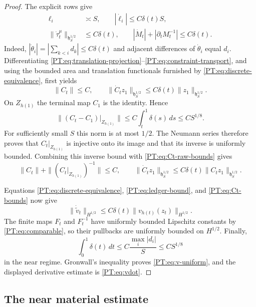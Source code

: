 \begin{proof}
The explicit rows give
\begin{align}
 \ell_i&\asymp S,\qquad
 |\dot\ell_i|\le C\delta(t)S,\label{PT:eq:constraint-row-bounds}\\
 \|\dot\tau_t^\mu\|_{\mathfrak h^{1/2}_S}
 &\le C\delta(t),\qquad
 |\dot M_t|+|\partial_tM_t^{-1}|\le C\delta(t).
\end{align}
Indeed, $|\dot\theta_i|=|\sum_{k<i}d_k|\le C\delta(t)$ and adjacent
differences of $\dot\theta_i$ equal $d_i$.  Differentiating
\eqref{PT:eq:translation-projection}--\eqref{PT:eq:constraint-transport}, and
using the bounded area and translation functionals furnished by
\eqref{PT:eq:discrete-equivalence}, first yields
\begin{equation}\label{PT:eq:Ct-raw-bounds}
 \|C_t\|\le C,
 \qquad
 \|\dot C_tz_1\|_{\mathfrak h^{1/2}_S}
 \le C\delta(t)\|z_1\|_{\mathfrak h^{1/2}_S}.
\end{equation}
On $Z_{h(1)}$ the terminal map $C_1$ is the identity.  Hence
\[
 \|(C_t-C_1)|_{Z_{h(1)}}\|
 \le C\int_t^1\delta(s)\,ds
 \le CS^{1/8}.
\]
For sufficiently small $S$ this norm is at most $1/2$.  The Neumann
series therefore proves that $C_t|_{Z_{h(1)}}$ is injective onto its
image and that its inverse is uniformly bounded.  Combining this inverse
bound with \eqref{PT:eq:Ct-raw-bounds} gives
\begin{equation}\label{PT:eq:Ct-bounds}
 \|C_t\|+\|(C_t|_{Z_{h(1)}})^{-1}\|\le C,\qquad
 \|\dot C_tz_1\|_{\mathfrak h^{1/2}_S}
 \le C\delta(t)\|C_tz_1\|_{\mathfrak h^{1/2}_S}.
\end{equation}

Equations \eqref{PT:eq:discrete-equivalence},
\eqref{PT:eq:ledger-bound}, and \eqref{PT:eq:Ct-bounds} now give
\[
 \|\dot{\widetilde v}_t\|_{H^{1/2}}
 \le C\delta(t)\|v_{h(t)}(z_t)\|_{H^{1/2}}.
\]
The finite maps $F_t$ and $F_t^{-1}$ have uniformly bounded Lipschitz
constants by \eqref{PT:eq:comparable}, so their pullbacks are uniformly
bounded on $H^{1/2}$.  Finally,
\begin{equation}\label{PT:eq:delta-integral}
 \int_0^1\delta(t)\,dt
 \le C\frac{\max_i|d_i|}{S}\le CS^{1/8}
\end{equation}
in the near regime.  Gronwall's inequality proves
\eqref{PT:eq:v-uniform}, and the displayed derivative estimate is
\eqref{PT:eq:vdot}.
\end{proof}

\subsection{The near material estimate}

